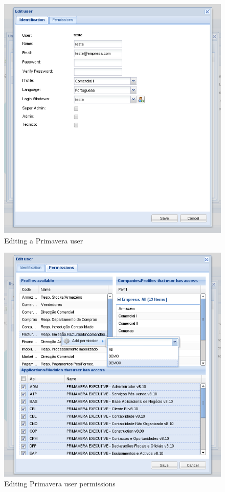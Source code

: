 \begin{figure}[H]
    \begin{center}
    \includegraphics[scale=0.6]{screenshots/primavera/primavera_edit_user.png}
    \caption{Editing a Primavera user}
    \label{fig:primavera_edit_user}
    \end{center}
\end{figure}

\begin{figure}[H]
    \begin{center}
    \includegraphics[scale=0.6]{screenshots/primavera/primavera_edit_user_permissions.png}
    \caption{Editing Primavera user permissions}
    \label{fig:primavera_edit_user}
    \end{center}
\end{figure}

